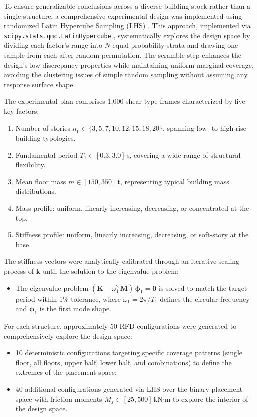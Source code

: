 \documentclass[preprint,12pt,authoryear]{elsarticle}
\newcommand{\np}{n_{\mathrm{p}}}
\newcommand{\Mf}{M_{\!f}}
\begin{document}
To ensure generalizable conclusions across a diverse building stock rather than a single structure, a comprehensive experimental design was implemented using randomized Latin Hypercube Sampling (LHS) \citep{McKay1979}. This approach, implemented via \texttt{scipy.stats.qmc.LatinHypercube} \citep{Virtanen2020}, systematically explores the design space by dividing each factor's range into $N$ equal-probability strata and drawing one sample from each after random permutation. The scramble step enhances the design's low-discrepancy properties while maintaining uniform marginal coverage, avoiding the clustering issues of simple random sampling without assuming any response surface shape.

The experimental plan comprises 1,000 shear-type frames characterized by five key factors:

\begin{enumerate}
	\item Number of stories $\np \in \{3, 5, 7, 10, 12, 15, 18, 20\}$, spanning low- to high-rise building typologies.
	\item Fundamental period $T_1 \in [0.3, 3.0]$\,s, covering a wide range of structural flexibility.
	\item Mean floor mass $\bar{m} \in [150, 350]$\,t, representing typical building mass distributions.
	\item Mass profile: uniform, linearly increasing, decreasing, or concentrated at the top.
	\item Stiffness profile: uniform, linearly increasing, decreasing, or soft-story at the base.
\end{enumerate}

The stiffness vectors were analytically calibrated through an iterative scaling process of $\bm{k}$ until the solution to the eigenvalue problem:

\begin{itemize}
	\item The eigenvalue problem $(\bm{K} - \omega_1^2\,\bm{M})\,\bm{\phi}_1 = \bm{0}$ is solved to match the target period within 1\% tolerance, where $\omega_1 = 2\pi/T_1$ defines the circular frequency and $\bm{\phi}_1$ is the first mode shape.
\end{itemize}

For each structure, approximately 50 RFD configurations were generated to comprehensively explore the design space:
\begin{itemize}
	\item 10 deterministic configurations targeting specific coverage patterns (single floor, all floors, upper half, lower half, and combinations) to define the extremes of the placement space;
	\item 40 additional configurations generated via LHS over the binary placement space with friction moments $\Mf \in [25, 500]$\,kN$\cdot$m to explore the interior of the design space.
\end{itemize}
\end{document}
